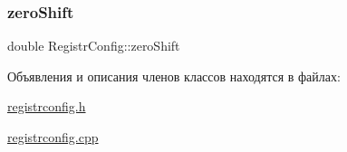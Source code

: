 \mbox{\label{class_registr_config_a1eba0a4fe2119907305a961bd946b851}} 
\subsubsection{\texorpdfstring{zero\+Shift}{zeroShift}}
{\footnotesize\ttfamily double Registr\+Config\+::zero\+Shift}



Объявления и описания членов классов находятся в файлах\+:\begin{DoxyCompactItemize}
\item 
\hyperlink{registrconfig_8h}{registrconfig.\+h}\item 
\hyperlink{registrconfig_8cpp}{registrconfig.\+cpp}\end{DoxyCompactItemize}
